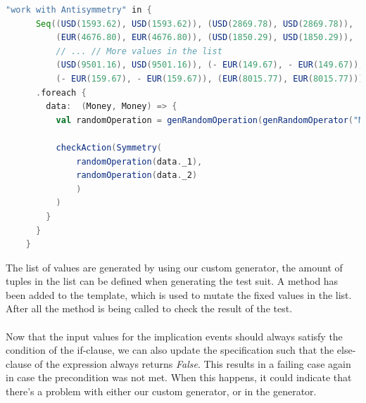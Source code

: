 \begin{sourcecode}[!ht]
\begin{lstlisting}[language=Scala]
"work with Antisymmetry" in {
      Seq((USD(1593.62), USD(1593.62)), (USD(2869.78), USD(2869.78)),
          (EUR(4676.80), EUR(4676.80)), (USD(1850.29), USD(1850.29)),
          // ... // More values in the list
          (USD(9501.16), USD(9501.16)), (- EUR(149.67), - EUR(149.67)),
          (- EUR(159.67), - EUR(159.67)), (EUR(8015.77), EUR(8015.77)))
      .foreach {
        data:  (Money, Money) => {
          val randomOperation = genRandomOperation(genRandomOperator("Money", true), generateRandomMoney(data._1.currency), generateRandomInteger(true), generateRandomInteger(false), generateRandomPercentage(true), generateRandomPercentage(false), Random.nextInt(10))

          checkAction(Symmetry(
              randomOperation(data._1),
              randomOperation(data._2)
              )
          )
        }
      }
    }
\end{lstlisting}
\caption{Resulting test case with semi-random values. Omitted some input tuples for readability.}
\label{lst:experiment2_second_resulting_test}
\end{sourcecode}
\FloatBarrier
The list of values are generated by using our custom generator, the amount of tuples in the list can be defined when generating the test suit. A method  has been added to the template, which is used to mutate the fixed values in the list. After all the  method is being called to check the result of the test.\\
\\
Now that the input values for the implication events should always satisfy the condition of the if-clause, we can also update the specification such that the else-clause of the expression always returns \textit{False}. This results in a failing case again in case the precondition was not met. When this happens, it could indicate that there's a problem with either our custom generator, or in the generator.

